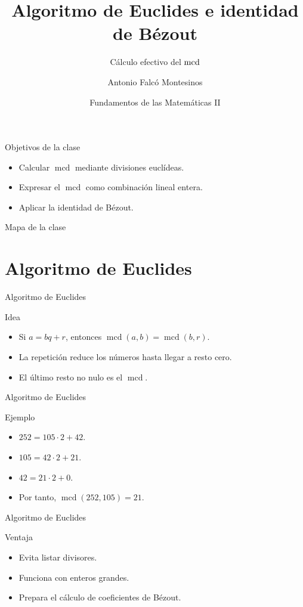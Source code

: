 \documentclass[aspectratio=169,11pt]{beamer}
\title[FdM II -- Clase 05]{Algoritmo de Euclides e identidad de Bézout}
\subtitle{Cálculo efectivo del \(\mcd\)}
\author{Antonio Falcó Montesinos}
\institute{Universidad CEU Cardenal Herrera}
\date{Fundamentos de las Matemáticas II}
\newcommand{\mcd}{\operatorname{mcd}}
\begin{document}
\begin{frame}
  \titlepage
\end{frame}

\begin{frame}{Objetivos de la clase}
\begin{itemize}
  \item Calcular \(\mcd\) mediante divisiones euclídeas.
  \item Expresar el \(\mcd\) como combinación lineal entera.
  \item Aplicar la identidad de Bézout.
\end{itemize}
\end{frame}

\begin{frame}{Mapa de la clase}
\tableofcontents
\end{frame}

\section{Algoritmo de Euclides}

\begin{frame}{Algoritmo de Euclides}
\begin{block}{Idea}
\begin{itemize}
  \item Si \(a=bq+r\), entonces \(\mcd(a,b)=\mcd(b,r)\).
  \item La repetición reduce los números hasta llegar a resto cero.
  \item El último resto no nulo es el \(\mcd\).
\end{itemize}
\end{block}
\end{frame}

\begin{frame}{Algoritmo de Euclides}
\begin{block}{Ejemplo}
\begin{itemize}
  \item \(252=105\cdot 2+42\).
  \item \(105=42\cdot 2+21\).
  \item \(42=21\cdot 2+0\).
  \item Por tanto, \(\mcd(252,105)=21\).
\end{itemize}
\end{block}
\end{frame}

\begin{frame}{Algoritmo de Euclides}
\begin{block}{Ventaja}
\begin{itemize}
  \item Evita listar divisores.
  \item Funciona con enteros grandes.
  \item Prepara el cálculo de coeficientes de Bézout.
\end{itemize}
\end{block}
\end{frame}
\end{document}
